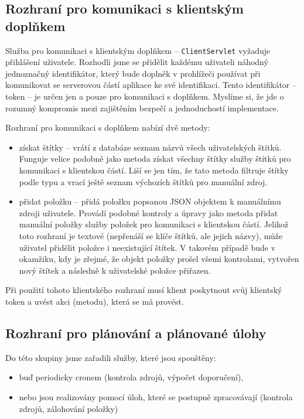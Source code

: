 \subsection{Rozhraní pro komunikaci s klientským doplňkem}

Služba pro komunikaci s klientským doplňkem -- \verb|ClientServlet| vyžaduje přihlášení uživatele.
Rozhodli jsme se přidělit každému uživateli náhodný jednoznačný identifikátor, který bude doplněk v prohlížeči používat při komunikovat se serverovou částí aplikace ke své identifikaci.
Tento identifikátor -- token -- je určen jen a pouze pro komunikaci s doplňkem.
Myslíme si, že jde o rozumný kompromis mezi zajištěním bezpečí a jednoduchostí implementace.

Rozhraní pro komunikaci s doplňkem nabízí dvě metody:
\begin{itemize}
	\item získat štítky -- vrátí z databáze seznam názvů všech uživatelských štítků.
		Funguje velice podobně jako metoda získat všechny štítky služby štítků pro komunikaci s klientskou částí.
		Liší se jen tím, že tato metoda filtruje štítky podle typu a vrací ještě seznam výchozích štítků pro manuální zdroj.
	\item přidat položku -- přidá položku popsanou JSON objektem k manuálnímu zdroji uživatele.
		Provádí podobné kontroly a úpravy jako metoda přidat manuální položky služby položek pro komunikaci s klientskou částí.
		Jelikož toto rozhraní je textové (nepřenáší se klíče štítků, ale jejich názvy), může uživatel přidělit položce i neexistující štítek.
		V takovém případě bude v okamžiku, kdy je zřejmé, že objekt položky prošel všemi kontrolami, vytvořen nový štítek a následně k uživatelské položce přiřazen.
\end{itemize}

Při použití tohoto klientského rozhraní musí klient poskytnout svůj klientský token a uvést akci (metodu), která se má provést.

\subsection{Rozhraní pro plánování a plánované úlohy}

Do této skupiny jsme zařadili služby, které jsou spouštěny:
\begin{itemize}
	\item buď periodicky cronem (kontrola zdrojů, výpočet doporučení),
	\item nebo jsou realizovány pomocí úloh, které se postupně zpracovávají (kontrola zdrojů, zálohování položky)
\end{itemize}

